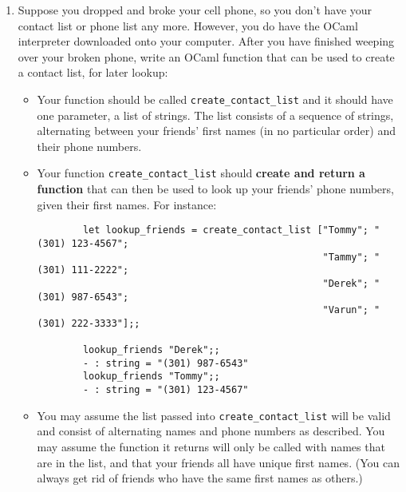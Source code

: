 \documentclass[11pt]{article}
\begin{document}
  \begin{enumerate}


    \item Suppose you dropped and broke your cell phone, so you don't have
          your contact list or phone list any more.  However, you do have
          the OCaml interpreter downloaded onto your computer.  After you
          have finished weeping over your broken phone, write an OCaml
          function that can be used to create a contact list, for later
          lookup:

          \vspace{-2.5mm}

          \begin{itemize}

            \addtolength{\itemsep}{1mm}

            \item Your function should be called
                  \texttt{create\_contact\_list} and it should have one
                  parameter, a list of strings.  The list consists of a
                  sequence of strings, alternating between your friends'
                  first names (in no particular order) and their phone
                  numbers.

            \item Your function \texttt{create\_contact\_list} should
                  \textbf{create and return a function} that can then be
                  used to look up your friends' phone numbers, given their
                  first names.  For instance:

                  \smallskip

                  \begin{Verbatim}
        let lookup_friends = create_contact_list ["Tommy"; "(301) 123-4567";
                                                  "Tammy"; "(301) 111-2222";
                                                  "Derek"; "(301) 987-6543";
                                                  "Varun"; "(301) 222-3333"];;

        lookup_friends "Derek";;
        - : string = "(301) 987-6543"
        lookup_friends "Tommy";;
        - : string = "(301) 123-4567"
                  \end{Verbatim}

            \item You may assume the list passed into
                  \texttt{create\_contact\_list} will be valid and consist
                  of alternating names and phone numbers as described.  You
                  may assume the function it returns will only be called
                  with names that are in the list, and that your friends all
                  have unique first names.  (You can always get rid of
                  friends who have the same first names as others.)


\end{itemize}
\end{enumerate}
\end{document}

